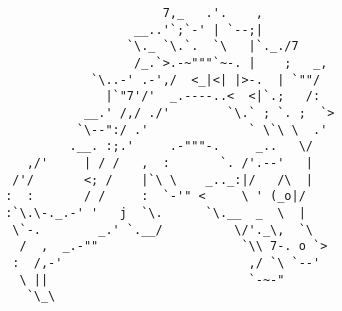 \documentclass{article}
\begin{document}
\vfill
\centering
\small
\begin{BVerbatim}
                       7,_   .'.    ,
                   __..'`;`-' | `--;|
                  `\._ `\.`.  `\   |`._./7
                   /_.`>.-~"""`~-. |    ;   _,
             `\..-' .-',/  <_|<| |>-.  | `""/
               |`"7'/'  _.----..<  <|`.;   /:
            __.' /,/ ./'        `\.` ; `. ;  `>
           `\--":/ .'              ` \`\ \  .'
          .__. :;.'     .-"""-.     _..   \/
    ,/'     | / /   ,  :       `. /'.--'   |
  /'/       <; /    |`\ \    _.._:|/   /\  |
 :  :       / /     :  `-'" <     \ ' (_o|/
 :`\.\-._.-' '   j  `\.      `\.__  _  \  |
  \`-.        _.' `.__/          \/'._\,  `\
   /  ,  _.-""                    `\\ 7-. o `>
  :  /,-'                          ,/ `\ `--'
   \ ||                            `-~-" 
    `\_\ 
\end{BVerbatim}
\end{document}
